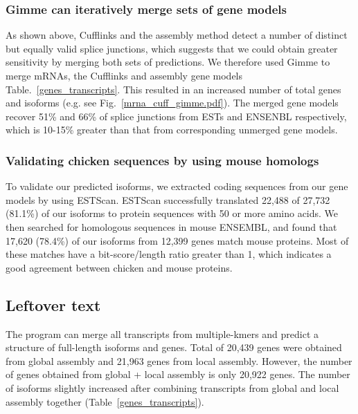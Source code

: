 \documentclass[10pt]{article}
\begin{document}

\subsubsection*{Gimme can iteratively merge sets of gene models}


As shown above, Cufflinks and the assembly method detect a number of
distinct but equally valid splice junctions, which suggests that we
could obtain greater sensitivity by merging both sets of predictions.
We therefore used Gimme to merge mRNAs, the Cufflinks and assembly gene
models Table.~\ref{genes_transcripts}.  This resulted in an increased 
number of total genes and isoforms (e.g. see Fig.~\ref{mrna_cuff_gimme.pdf}).
The merged gene models recover 51\% and 66\% of splice junctions from ESTs
and ENSENBL respectively, which is 10-15\% greater than that from corresponding
unmerged gene models.

\subsubsection*{Validating chicken sequences by using mouse homologs}

To validate our predicted isoforms, we extracted coding sequences from
our gene models by using ESTScan\cite{Iseli:1999vd}.  ESTScan
successfully translated 22,488 of 27,732 (81.1\%) of our isoforms to
protein sequences with 50 or more amino acids.  We then searched for
homologous sequences in mouse ENSEMBL, and found that 17,620 (78.4\%)
of our isoforms from 12,399 genes match mouse proteins.
Most of these matches have a bit-score/length ratio greater than 1,
which indicates a good agreement between chicken and mouse proteins.

\subsection*{Leftover text}

The program can merge all transcripts from multiple-kmers and predict
a structure of full-length isoforms and genes.
Total of 20,439 genes were obtained from global assembly and 21,963 genes
from local assembly.
However, the number of genes obtained from global + local assembly is only 20,922 genes.
The number of isoforms slightly increased after combining
transcripts from global and local assembly together (Table~\ref{genes_transcripts}). 
\end{document}
